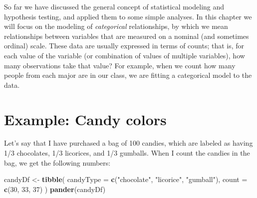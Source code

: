 \documentclass[]{book}
\newenvironment{Shaded}{\begin{snugshade}}{\end{snugshade}}
\newcommand{\KeywordTok}[1]{\textcolor[rgb]{0.13,0.29,0.53}{\textbf{#1}}}
\newcommand{\DataTypeTok}[1]{\textcolor[rgb]{0.13,0.29,0.53}{#1}}
\newcommand{\DecValTok}[1]{\textcolor[rgb]{0.00,0.00,0.81}{#1}}
\newcommand{\StringTok}[1]{\textcolor[rgb]{0.31,0.60,0.02}{#1}}
\newcommand{\NormalTok}[1]{#1}
\theoremstyle{definition}
\theoremstyle{definition}
\theoremstyle{definition}
\theoremstyle{remark}
\begin{document}
So far we have discussed the general concept of statistical modeling and
hypothesis testing, and applied them to some simple analyses. In this
chapter we will focus on the modeling of \emph{categorical}
relationships, by which we mean relationships between variables that are
measured on a nominal (and sometimes ordinal) scale. These data are
usually expressed in terms of counts; that is, for each value of the
variable (or combination of values of multiple variables), how many
observations take that value? For example, when we count how many people
from each major are in our class, we are fitting a categorical model to
the data.

\section{Example: Candy colors}\label{example-candy-colors}

Let's say that I have purchased a bag of 100 candies, which are labeled
as having 1/3 chocolates, 1/3 licorices, and 1/3 gumballs. When I count
the candies in the bag, we get the following numbers:

\begin{Shaded}
\begin{Highlighting}[]
\NormalTok{candyDf <-}
\StringTok{  }\KeywordTok{tibble}\NormalTok{(}
    \DataTypeTok{candyType =} \KeywordTok{c}\NormalTok{(}\StringTok{"chocolate"}\NormalTok{, }\StringTok{"licorice"}\NormalTok{, }\StringTok{"gumball"}\NormalTok{),}
    \DataTypeTok{count =} \KeywordTok{c}\NormalTok{(}\DecValTok{30}\NormalTok{, }\DecValTok{33}\NormalTok{, }\DecValTok{37}\NormalTok{)}
\NormalTok{  )}
\KeywordTok{pander}\NormalTok{(candyDf)}
\end{Highlighting}
\end{Shaded}
\end{document}
